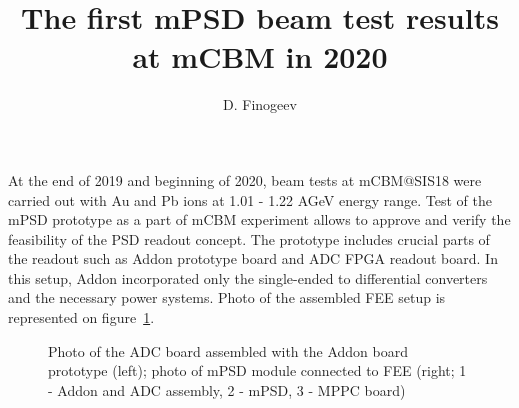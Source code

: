 \documentclass{CBM-PR-2020}
\begin{document}
\title{
The first mPSD beam test results at mCBM in 2020
}

\author[a]{D. Finogeev}






\maketitle


At the end of 2019 and beginning of 2020, beam tests at mCBM@SIS18 were carried out with Au and Pb ions at 1.01 - 1.22 AGeV energy range. Test of the mPSD prototype as a part of mCBM experiment allows to approve and verify the feasibility of the PSD readout concept. The prototype includes crucial parts of the readout such as Addon prototype board and ADC FPGA readout board. In this setup, Addon incorporated only the single-ended to differential converters and the necessary power systems. Photo of the assembled FEE setup is represented on figure~\ref{fig:4}.

\begin{figure}[htbp]
\centering %
\qquad
{}
\caption{\label{fig:4} Photo of the ADC board assembled with the Addon board prototype (left); photo of mPSD module connected to FEE (right; 1 - Addon and ADC assembly, 2 - mPSD, 3 - MPPC board)}
\end{figure}
\end{document}

